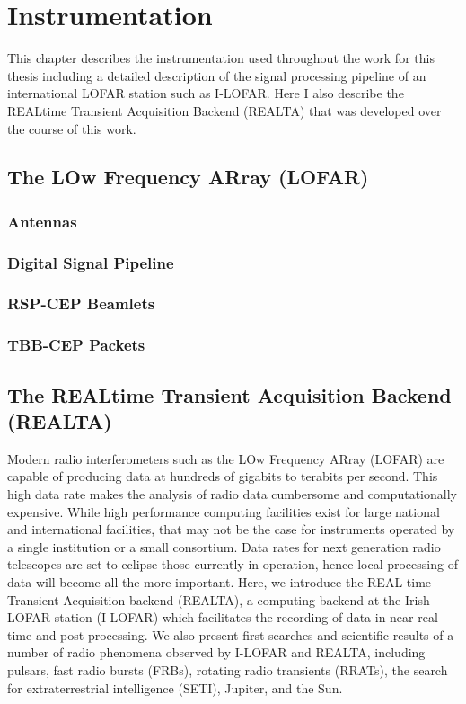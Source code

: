 \doublespacing
\chapter{Instrumentation}
\label{chap:instrumentation}
This chapter describes the instrumentation used throughout the work for this thesis including a detailed description of the signal processing pipeline of an international LOFAR station such as I-LOFAR. Here I also describe the REALtime Transient Acquisition Backend (REALTA) that was developed over the course of this work.

\section{The LOw Frequency ARray (LOFAR)}
\subsection{Antennas}
\subsection{Digital Signal Pipeline}
\subsection{RSP-CEP Beamlets}
\subsection{TBB-CEP Packets}
\section{The REALtime Transient Acquisition Backend (REALTA)}
Modern radio interferometers such as the LOw Frequency ARray (LOFAR) are capable of producing data at hundreds of gigabits to terabits per second. This high data rate makes the analysis of radio data cumbersome and computationally expensive. While high performance computing facilities exist for large national and international facilities, that may not be the case for instruments operated by a single institution or a small consortium. 
Data rates for next generation radio telescopes are set to eclipse those currently in operation, hence local processing of data will become all the more important.
Here, we introduce the REAL-time Transient Acquisition backend (REALTA), a computing backend at the Irish LOFAR station (I-LOFAR) which facilitates the recording of data in near real-time and post-processing. We also present first searches and scientific results of a number of radio phenomena observed by I-LOFAR and REALTA, including pulsars, fast radio bursts (FRBs), rotating radio transients (RRATs), the search for extraterrestrial intelligence (SETI), Jupiter, and the Sun.


